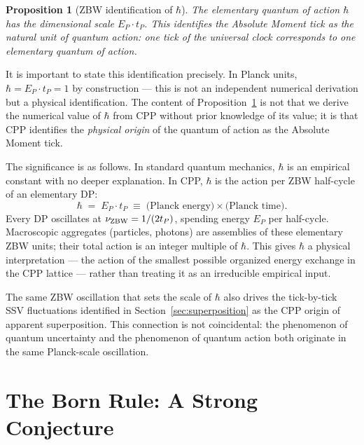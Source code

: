 \documentclass[12pt]{article}
\newtheorem{proposition}[theorem]{Proposition}
\newcommand{\EP}{E_P}
\newcommand{\tP}{t_P}
\begin{document}
\begin{proposition}[ZBW identification of $\hbar$]
\label{prop:hbar}
The elementary quantum of action $\hbar$ has the dimensional scale
$\EP\cdot\tP$.  This identifies the Absolute Moment tick as the natural unit
of quantum action: one tick of the universal clock corresponds to one
elementary quantum of action.
\end{proposition}

It is important to state this identification precisely.  In Planck units,
$\hbar = \EP\cdot\tP = 1$ by construction --- this is not an independent
numerical derivation but a physical identification.  The content of
Proposition~\ref{prop:hbar} is not that we derive the numerical value of
$\hbar$ from CPP without prior knowledge of its value; it is that CPP
identifies the \emph{physical origin} of the quantum of action as the
Absolute Moment tick.

The significance is as follows.  In standard quantum mechanics, $\hbar$ is an
empirical constant with no deeper explanation.  In CPP, $\hbar$ is the action
per ZBW half-cycle of an elementary DP:
\begin{equation}
  \hbar \;=\; \EP \cdot \tP
  \;\equiv\; \text{(Planck energy)} \times \text{(Planck time)}.
  \label{eq:hbar}
\end{equation}
Every DP oscillates at $\nu_{\rm ZBW} = 1/(2\tP)$, spending energy $\EP$
per half-cycle.  Macroscopic aggregates (particles, photons) are assemblies
of these elementary ZBW units; their total action is an integer multiple of
$\hbar$.  This gives $\hbar$ a physical interpretation --- the action of the
smallest possible organized energy exchange in the CPP lattice --- rather than
treating it as an irreducible empirical input.

The same ZBW oscillation that sets the scale of $\hbar$ also drives the
tick-by-tick SSV fluctuations identified in Section~\ref{sec:superposition}
as the CPP origin of apparent superposition.  This connection is not
coincidental: the phenomenon of quantum uncertainty and the phenomenon of
quantum action both originate in the same Planck-scale oscillation.

\section{The Born Rule: A Strong Conjecture}
\label{sec:born}
\end{document}
